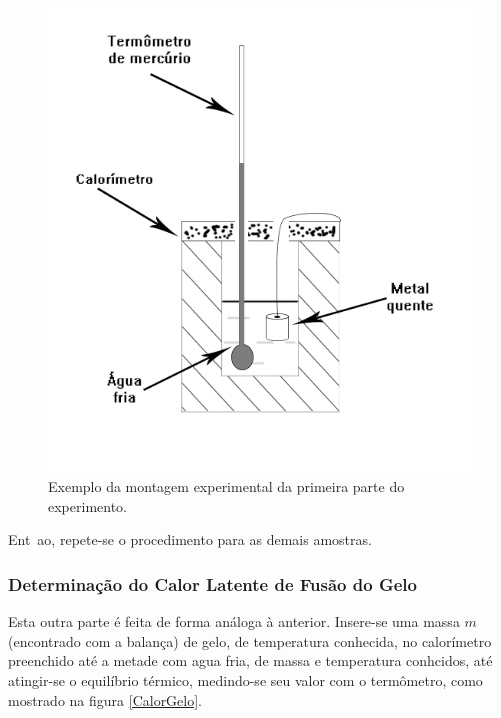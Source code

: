\documentclass[12pt,a4paper]{article}
\begin{document}
\begin{figure}[!htbp]
\centering
\includegraphics[scale=0.55]{Fig6b1.jpg}
\caption{Exemplo da montagem experimental da primeira parte do experimento.}
\label{CalorMetais}
\end{figure}

Ent~ao, repete-se o procedimento para as demais amostras.

\subsubsection{Determinação do Calor Latente de Fusão do Gelo}

Esta outra parte é feita de forma análoga à anterior. Insere-se uma massa $m$ (encontrado com a balança) de gelo, de temperatura conhecida, no calorímetro preenchido até a metade com agua fria, de massa e temperatura conhcidos, até atingir-se o equilíbrio térmico, medindo-se seu valor com o termômetro, como mostrado na figura \ref{CalorGelo}.
\end{document}
